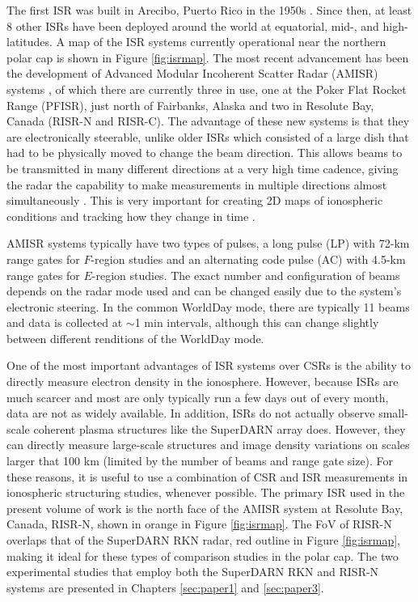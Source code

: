 The first ISR was built in Arecibo, Puerto Rico in the 1950s \citep{Gordon1958}.  Since then, at least 8 other ISRs have been deployed around the world at equatorial, mid-, and high-latitudes.  A map of the ISR systems currently operational near the northern polar cap is shown in Figure \ref{fig:isrmap}.  The most recent advancement has been the development of Advanced Modular Incoherent Scatter Radar (AMISR) systems \citep{Heinselman2008}, of which there are currently three in use, one at the Poker Flat Rocket Range (PFISR), just north of Fairbanks, Alaska and two in Resolute Bay, Canada (RISR-N and RISR-C).  The advantage of these new systems is that they are electronically steerable, unlike older ISRs which consisted of a large dish that had to be physically moved to change the beam direction.  This allows beams to be transmitted in many different directions at a very high time cadence, giving the radar the capability to make measurements in multiple directions almost simultaneously \citep{Nicolls2007a,Nicolls2007b,Heinselman2008,Bahcivan2010}.  This is very important for creating 2D maps of ionospheric conditions and tracking how they change in time \citep{Semeter2009,Dahlgren2012a,Dahlgren2012b}.

AMISR systems typically have two types of pulses, a long pulse (LP) with 72-km range gates for \(F\)-region studies and an alternating code pulse (AC) with 4.5-km range gates for \(E\)-region studies.  The exact number and configuration of beams depends on the radar mode used and can be changed easily due to the system's electronic steering.  In the common WorldDay mode, there are typically 11 beams and data is collected at \(\sim\)1 min intervals, although this can change slightly between different renditions of the WorldDay mode.

One of the most important advantages of ISR systems over CSRs is the ability to directly measure electron density in the ionosphere.  However, because ISRs are much scarcer and most are only typically run a few days out of every month, data are not as widely available.  In addition, ISRs do not actually observe small-scale coherent plasma structures like the SuperDARN array does.  However, they can directly measure large-scale structures and image density variations on scales larger that 100 km (limited by the number of beams and range gate size).  For these reasons, it is useful to use a combination of CSR and ISR measurements in ionospheric structuring studies, whenever possible.  The primary ISR used in the present volume of work is the north face of the AMISR system at Resolute Bay, Canada, RISR-N, shown in orange in Figure \ref{fig:isrmap}.  The FoV of RISR-N overlaps that of the SuperDARN RKN radar, red outline in Figure \ref{fig:isrmap}, making it ideal for these types of comparison studies in the polar cap.  The two experimental studies that employ both the SuperDARN RKN and RISR-N systems are presented in Chapters \ref{sec:paper1} and \ref{sec:paper3}.

